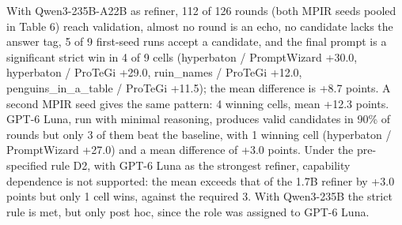 \documentclass{ieeeaccess}
\begin{document}
\begin{table}[htbp]
\centering
\footnotesize
\caption{Refiner capability on the nine Tier-1 seed-42 cells; the target stays Qwen3-1.7B. Validated is the share of rounds reaching validation. Runs changed, strict wins and the strict mean refer to the final prompt versus P0 under strict extraction; the last two columns give wins/losses and the mean difference under lenient extraction. 1.7B rows pool up to three MPIR seeds, the others use MPIR seed 1.}
\end{table}

With Qwen3-235B-A22B as refiner, 112 of 126 rounds (both MPIR seeds pooled in Table 6) reach validation, almost no round is an echo, no candidate lacks the answer tag, 5 of 9 first-seed runs accept a candidate, and the final prompt is a significant strict win in 4 of 9 cells (hyperbaton / PromptWizard +30.0, hyperbaton / ProTeGi +29.0, ruin\_\allowbreak{}names / ProTeGi +12.0, penguins\_\allowbreak{}in\_\allowbreak{}a\_\allowbreak{}table / ProTeGi +11.5); the mean difference is +8.7 points. A second MPIR seed gives the same pattern: 4 winning cells, mean +12.3 points. GPT-6 Luna, run with minimal reasoning, produces valid candidates in 90\% of rounds but only 3 of them beat the baseline, with 1 winning cell (hyperbaton / PromptWizard +27.0) and a mean difference of +3.0 points. Under the pre-specified rule D2, with GPT-6 Luna as the strongest refiner, capability dependence is not supported: the mean exceeds that of the 1.7B refiner by +3.0 points but only 1 cell wins, against the required 3. With Qwen3-235B the strict rule is met, but only post hoc, since the role was assigned to GPT-6 Luna.
\end{document}
